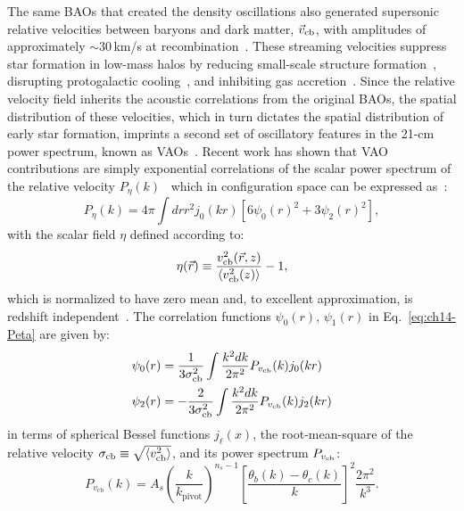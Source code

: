 The same BAOs that created the density oscillations also generated supersonic relative velocities between baryons and dark matter, $\vec{v}_{\rm cb}$, with amplitudes of approximately $\sim 30\,$km/s at recombination~\citep{tseliakhovich10, dalal10}. These streaming velocities suppress star formation in low-mass halos by reducing small-scale structure formation~\citep{mcquinn12,fialkov12,tseliakhovich10,naoz12, bovy13,munoz19}, disrupting protogalactic cooling~\citep{dalal10, greif11, hirano18, schauer19}, and inhibiting gas accretion~\citep{dalal10, tseliakhovich11, stacy11, oleary12, naoz13}.  Since the relative velocity field inherits the acoustic correlations from the original BAOs, the spatial distribution of these velocities, which in turn dictates the spatial distribution of early star formation, imprints a second set of oscillatory features in the 21-cm power spectrum, known as VAOs~\citep{visbal12, mcquinn12, fialkov12, Fialkov:2013uwm, munoz19}.  Recent work has shown that VAO contributions are simply exponential correlations of the scalar power spectrum of the relative velocity $P_\eta(k)$~\cite{Cruz:2024fsv} which in configuration space
can be expressed as~\cite{dalal10}:
\begin{equation}
    P_\eta(k) =4 \pi \int d r r^2 j_0(k r)\left[6 \psi_0(r)^2+3 \psi_2(r)^2\right], \label{eq:ch14-Peta}
\end{equation}
with the scalar field $\eta$ defined according to:
\begin{equation}
    \eta(\vec{r})\equiv \frac{v^2_{\rm cb}(\vec{r},z)}{\left\langle v_{\rm cb}^2(z)\right\rangle}-1,
\end{equation}
which is normalized to have zero mean and, to excellent approximation, is redshift independent~\cite{ferraro12}. The correlation functions $\psi_0(r),\,\psi_1(r)$ in Eq.~\eqref{eq:ch14-Peta} are given by:
\begin{align}
    \psi_0(r)&=\frac{1}{3\sigma_{\rm cb}^2} \int \frac{k^2 d k}{2 \pi^2} P_{v_{\mathrm{cb}}}(k) j_0(k r) \\
    \psi_2(r)&=-\frac{2}{3\sigma_{\rm cb}^2} \int \frac{k^2 d k}{2 \pi^2} P_{v_{\mathrm{cb}}}(k) j_2(k r)
\end{align}
in terms of spherical Bessel functions $j_\ell(x)$, the root-mean-square of the relative velocity $\sigma_{\rm cb}\equiv\sqrt{\left\langle v_{\rm cb}^2\right\rangle}$, and its power spectrum $P_{v_{\rm cb}}$:
\begin{equation}
P_{v_{\mathrm{cb}}}(k)=A_s\left(\frac{k}{k_{\mathrm{pivot}}}\right)^{n_s-1}\left[\frac{\theta_b(k)-\theta_c(k)}{k}\right]^2 \frac{2 \pi^2}{k^3}.\label{eq:ch14-Pvcb}
\end{equation}
